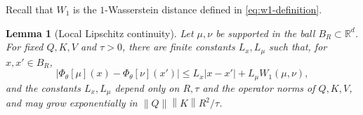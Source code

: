 \documentclass[11pt]{amsart}
\numberwithin{equation}{section}
\theoremstyle{plain}
\newtheorem{lemma}[theorem]{Lemma}
\newcommand{\R}{\mathbb{R}}
\newcommand{\dd}{\,\mathrm{d}}
\newcommand{\abs}[1]{\left\lvert#1\right\rvert}
\newcommand{\norm}[1]{\left\lVert#1\right\rVert}
\begin{document}
Recall that $W_1$ is the $1$-Wasserstein distance defined in \eqref{eq:w1-definition}.  

\begin{lemma}[Local Lipschitz continuity]\label{lem:attention-lipschitz}
Let $\mu,\nu$ be supported in the ball $B_R\subset\R^d$.  For fixed
$Q,K,V$ and $\tau>0$, there are finite constants $L_x,L_\mu$ such that, for
$x,x'\in B_R$,
\begin{equation}\label{eq:attn-lip}
 \abs{\Phi_\theta[\mu](x)-\Phi_\theta[\nu](x')}
 \leq L_x\abs{x-x'}+L_\mu W_1(\mu,\nu), 
\end{equation}
and the constants $L_x,L_\mu$ depend only on $R,\tau$ and the operator norms of $Q,K,V$, and may grow
exponentially in $\norm{Q}\norm{K}R^2/\tau$.
\end{lemma}
\end{document}
